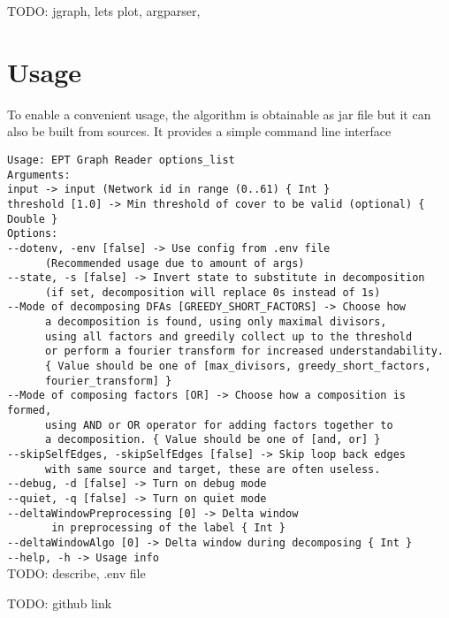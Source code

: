 TODO: jgraph, lets plot, argparser, 

\section{Usage}
To enable a convenient usage, the algorithm is obtainable as jar file but it can also be built from sources. It provides a simple command line interface

\verb|Usage: EPT Graph Reader options_list|\\
\verb|Arguments: |\\
\verb|input -> input (Network id in range (0..61) { Int }|\\
\verb|threshold [1.0] -> Min threshold of cover to be valid (optional) { Double }|\\
\verb|Options: |\\
\verb|--dotenv, -env [false] -> Use config from .env file|\\
\verb|		(Recommended usage due to amount of args) |\\
\verb|--state, -s [false] -> Invert state to substitute in decomposition|\\
\verb|		(if set, decomposition will replace 0s instead of 1s) |\\
\verb|--Mode of decomposing DFAs [GREEDY_SHORT_FACTORS] -> Choose how|\\
\verb|		a decomposition is found, using only maximal divisors,|\\
\verb|		using all factors and greedily collect up to the threshold|\\
\verb|		or perform a fourier transform for increased understandability.|\\
\verb|		{ Value should be one of [max_divisors, greedy_short_factors,|\\
\verb| 		fourier_transform] }|\\
\verb|--Mode of composing factors [OR] -> Choose how a composition is formed,|\\
\verb|		using AND or OR operator for adding factors together to|\\
\verb|		a decomposition. { Value should be one of [and, or] }|\\
\verb|--skipSelfEdges, -skipSelfEdges [false] -> Skip loop back edges|\\
\verb|		with same source and target, these are often useless. |\\
\verb|--debug, -d [false] -> Turn on debug mode |\\
\verb|--quiet, -q [false] -> Turn on quiet mode |\\
\verb|--deltaWindowPreprocessing [0] -> Delta window|\\
\verb|		 in preprocessing of the label { Int }|\\
\verb|--deltaWindowAlgo [0] -> Delta window during decomposing { Int }|\\
\verb|--help, -h -> Usage info |\\

TODO: describe, .env file

TODO: github link
